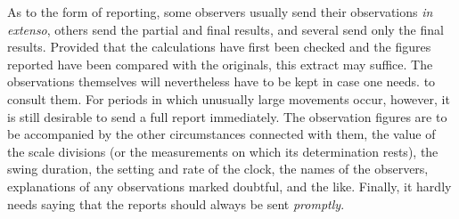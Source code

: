 As to the form of reporting, some observers usually send their observations \textit{in extenso}, others send the partial and final results, and several send only the final results. Provided that the calculations have first been checked and the figures reported have been compared with the originals, this extract may suffice. The observations themselves will nevertheless have to be kept in case one needs.
to consult them. For periods in which unusually large movements occur, however, it is still desirable to send a full report immediately. The observation figures are to be accompanied by the other circumstances connected with them, the value of the scale divisions (or the measurements on which its determination rests), the swing duration, the setting and rate of the clock, the names of the observers, explanations of any observations marked doubtful, and the like. Finally, it hardly needs saying that the reports should always be sent \textit{promptly}.

